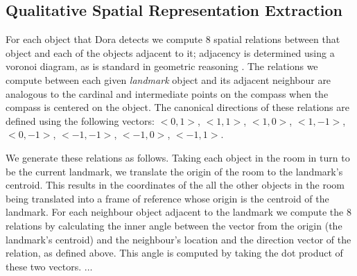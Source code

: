 \subsection{Qualitative Spatial Representation Extraction}


For each object that Dora detects we compute 8 spatial relations between that object and each of the objects adjacent to it; adjacency is determined using a voronoi diagram, as is standard in geometric reasoning \cite{Forbus/etal2003}. The relations we compute between each given \emph{landmark} object and its adjacent neighbour are analogous to the cardinal and intermediate points on the compass when the compass is centered on the object. The canonical directions of these relations are defined using the following vectors: $<0,1>$, $<1,1>$, $<1,0>$, $<1,-1>$, $<0,-1>$, $<-1,-1>$, $<-1,0>$, $<-1,1>$.

We generate these relations as follows. Taking each object in the room in turn to be the current landmark, we translate the origin of the room to the landmark's centroid. This results in the coordinates of the all the other objects in the room being translated into a frame of reference whose origin is the centroid of the landmark.  For each neighbour object adjacent to the landmark we compute the 8 relations by calculating the inner angle between the vector from the origin (the landmark's centroid) and the neighbour's location and the direction vector of the relation, as defined above. This angle is computed by taking the dot product of these two vectors. $\dots$




